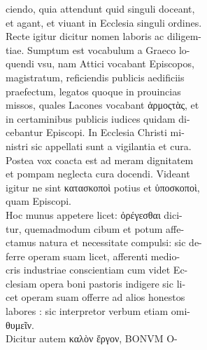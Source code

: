 \documentclass{article}
\begin{document}
\begin{pages}
                ciendo, quia attendunt quid singuli doceant, \\
                et agant, et viuant in Ecclesia singuli ordines. \\
                Recte igitur dicitur nomen laboris ac diligem- \\
                tiae. Sumptum est vocabulum a Graeco lo- \\
                quendi vsu, nam Attici vocabant Episcopos, \\
                magistratum, reficiendis publicis aedificiis \\
                praefectum, legatos quoque in prouincias \\
                missos, quales Lacones vocabant ἁρμοςτὰς, et \\
                in certaminibus publicis iudices quidam di- \\
                cebantur Episcopi. In Ecclesia Christi mi- \\
                nistri sic appellati sunt a vigilantia et cura. \\
                Postea vox coacta est ad meram dignitatem \\
                et pompam neglecta cura docendi. Videant \\
                igitur ne sint κατασκοποὶ potius et ὑποσκοποὶ, \\
                quam Episcopi. \\
                Hoc munus appetere licet: ὀρέγεσθαι dici- \\
                tur, quemadmodum cibum et potum affe- \\
                ctamus natura et necessitate compulsi: sic de- \\
                ferre operam suam licet, afferenti medio- \\
                cris industriae conscientiam cum videt Ec- \\
                clesiam opera boni pastoris indigere sic li- \\
                cet operam suam offerre ad alios honestos \\
                labores : sic interpretor verbum etiam omi- \\
                θυμεῖν. \\
                Dicitur autem καλὸν ἔργον, BONVM O- \\

\end{pages}
\end{document}
